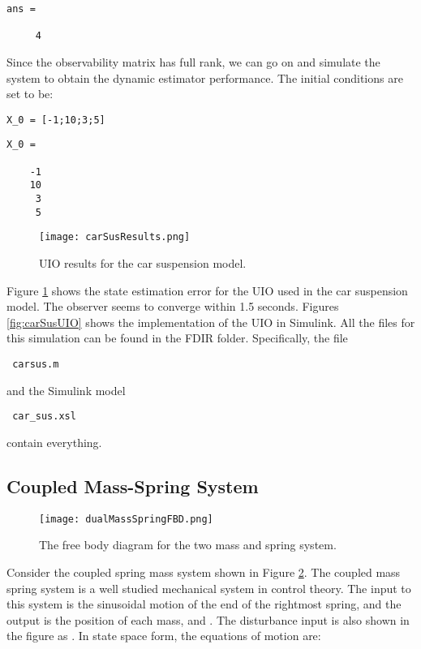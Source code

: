 \documentclass{amsart}
\theoremstyle{definition}
\theoremstyle{remark}
\numberwithin{equation}{section}
\begin{document}
        \color{lightgray} \begin{verbatim}
ans =

     4

\end{verbatim} \color{black}
    
Since the observability matrix has full rank, we can go on and simulate the system to obtain the dynamic estimator performance. The initial conditions are set to be: 

\begin{verbatim}
X_0 = [-1;10;3;5]
\end{verbatim}

        \color{lightgray} \begin{verbatim}
X_0 =

    -1
    10
     3
     5

\end{verbatim} \color{black}

\begin{figure}
    \centering
    \texttt{[image: carSusResults.png]}
    \caption{UIO results for the car suspension model.}
    \label{fig:carSusResults}
\end{figure}

Figure \ref{fig:carSusResults} shows the state estimation error for the UIO used in the car suspension model. The observer seems to converge within 1.5 seconds.  Figures \ref{fig:carSusUIO} shows the implementation of the UIO in Simulink.  All the files for this simulation can be found in the \color{lightgray}FDIR \color{black} folder. Specifically, the file \begin{verbatim} carsus.m \end{verbatim} and the Simulink model \begin{verbatim} car_sus.xsl \end{verbatim} contain everything. 

\subsection{Coupled Mass-Spring System}

\begin{figure}[H]
    \centering
    \texttt{[image: dualMassSpringFBD.png]}
    \caption{The free body diagram for the two mass and spring system.}
    \label{fig:dualMS}
\end{figure}

Consider the coupled spring mass system shown in Figure \ref{fig:dualMS}. The coupled mass spring system is a well studied mechanical system in control theory. The input to this system is the sinusoidal motion of the end of the rightmost spring, and the output is the position of each mass,  and . The disturbance input is also shown in the figure as . In state space form, the equations of motion are: 
\end{document}
